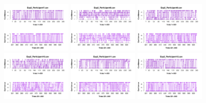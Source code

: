 \begin{figure}[th]
\includegraphics[width=0.30\textwidth]{Figures/Rating_Exp2_P7} \includegraphics[width=0.30\textwidth]{Figures/Rating_Exp2_P8} \includegraphics[width=0.30\textwidth]{Figures/Rating_Exp2_P9}
\includegraphics[width=0.30\textwidth]{Figures/Rating_Exp2_P10} \includegraphics[width=0.30\textwidth]{Figures/Rating_Exp2_P11} \includegraphics[width=0.30\textwidth]{Figures/Rating_Exp2_P12}

\end{figure}
